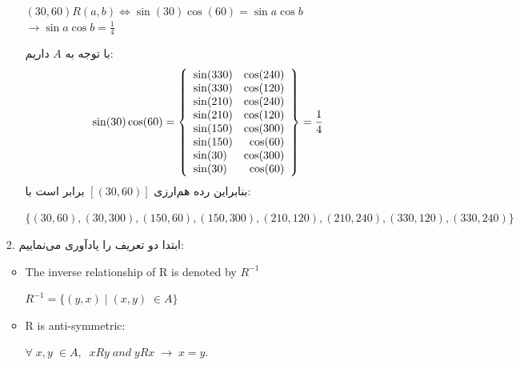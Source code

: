 \begin{enumerate}
\begin{enumerate}
\begin{center}
            $(30, 60)R(a, b) \Leftrightarrow
            \sin(30)\cos(60) = \sin a \cos b$\\[0.1in]
            $\longrightarrow \sin a \cos b = \frac{1}{4}$
        \end{center}
        با توجه به $A$ داریم:\\[0.1in]
        \[
    \sin(30)\cos(60) = \left\{\begin{array}{lr}
        \sin(330)&\cos(240)\\
            \sin(330)&\cos(120)\\
            \sin(210)&\cos(240)\\
            \sin(210)&\cos(120)\\
            \sin(150)&\cos(300)\\
            \sin(150)&\cos(60)\\
            \sin(30)&\cos(300)\\
            \sin(30)&\cos(60)\\
        \end{array}\right\} = \frac{1}{4}\\[0.15in]
  \]
    بنابراین رده هم‌ارزی 
    $[(30, 60)]$ برابر است با:
\begin{center}
    $\{(30,60), (30, 300), (150, 60), (150, 300), (210,120)
    , (210, 240), (330, 120), (330, 240)\}$\\[0.2in]
\end{center}
    \end{enumerate}
    \item[2.]
    ابتدا دو تعریف را یادآوری می‌نماییم:\\[0.1in]
    \begin{latin}
        \begin{itemize}
            \item The inverse relationship of R is denoted by $R^{-1}$\\[0.05in]
            \begin{center}
                $R^{-1} = \{(y,x)\; |\; (x,y) \; \in A\}$
            \end{center}
            \item 
            R is anti-symmetric:\\[0.05in]
            \begin{center}
                $\forall \; x,y\;\in A, \;\;
                xRy\;\textit{and}\;yRx\;
                \rightarrow\;
                x=y.$\\[0.1in]
            \end{center}

\end{itemize}
\end{latin}
\end{enumerate}
